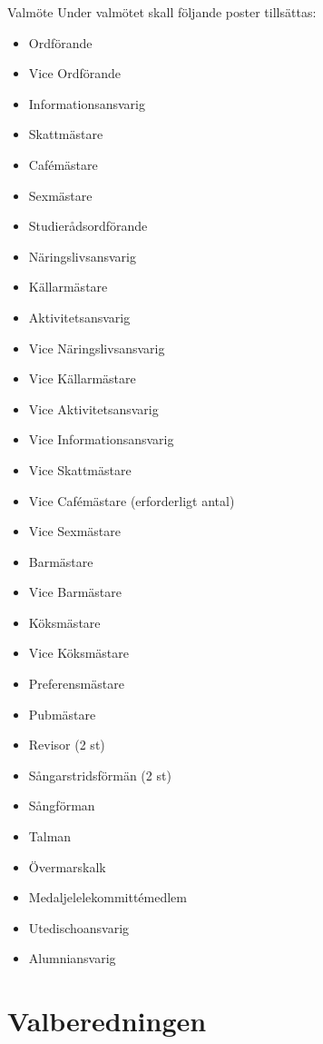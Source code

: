\documentclass[pdfbookmarks,a4paper,11pt]{article}
\newlength{\itemcollength}
\newenvironment{reglemlista}{%
  \begin{list}{}{%
      \setlength{\labelwidth}{\itemcollength}%
      \setlength{\leftmargin}{\labelwidth + \labelsep}%
      \renewcommand{\makelabel}[1]{%
        \raisebox{0pt}[1ex][0pt]{%
          \makebox[\labelwidth][l]{%
            \parbox[t]{\itemcollength}{%
              \raggedright\hspace{0pt}##1}}}\hfill}%
      }}{%
  \end{list}}
\begin{document}
\begin{reglemlista}
  \item[Valmöte]
   Under valmötet skall följande poster tillsättas:
    \begin{itemize}
      \item Ordförande
      \item Vice Ordförande
      \item Informationsansvarig
      \item Skattmästare
      \item Cafémästare
      \item Sexmästare
      \item Studierådsordförande
      \item Näringslivsansvarig
      \item Källarmästare
      \item Aktivitetsansvarig
      \item Vice Näringslivsansvarig
      \item Vice Källarmästare
      \item Vice Aktivitetsansvarig
      \item Vice Informationsansvarig
      \item Vice Skattmästare
      \item Vice Cafémästare (erforderligt antal)
      \item Vice Sexmästare
      \item Barmästare
      \item Vice Barmästare
      \item Köksmästare
      \item Vice Köksmästare
      \item Preferensmästare
      \item Pubmästare
      \item Revisor (2 st)
      \item Sångarstridsförmän (2 st)
      \item Sångförman
      \item Talman
      \item Övermarskalk
      \item Medaljelelekommittémedlem
      \item Utedischoansvarig
      \item Alumniansvarig
    \end{itemize}

\end{reglemlista}

\section{Valberedningen}
\end{document}
